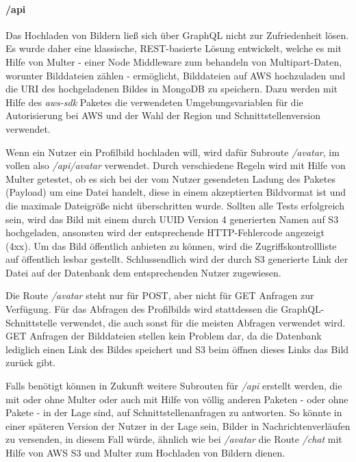 \paragraph{/api\\}
Das Hochladen von Bildern ließ sich über GraphQL nicht zur Zufriedenheit lösen. Es wurde daher eine klassische, REST-basierte Lösung entwickelt, welche es mit Hilfe von Multer - einer Node Middleware zum behandeln von Multipart-Daten, worunter Bilddateien zählen - ermöglicht, Bilddateien auf AWS hochzuladen und die URI des hochgeladenen Bildes in MongoDB zu speichern. Dazu werden mit Hilfe des \textit{aws-sdk} Paketes die verwendeten Umgebungsvariablen für die Autorisierung bei AWS und der Wahl der Region und Schnittstellenversion verwendet. 

Wenn ein Nutzer ein Profilbild hochladen will, wird dafür Subroute \textit{/avatar}, im vollen also \textit{/api/avatar} verwendet. Durch verschiedene Regeln wird mit Hilfe von Multer getestet, ob es sich bei der vom Nutzer gesendeten Ladung des Paketes (Payload) um eine Datei handelt, diese in einem akzeptierten Bildvormat ist und die maximale Dateigröße nicht überschritten wurde. Sollten alle Tests erfolgreich sein, wird das Bild mit einem durch UUID Version 4 generierten Namen auf S3 hochgeladen, ansonsten wird der entsprechende HTTP-Fehlercode angezeigt (4xx). Um das Bild öffentlich anbieten zu können, wird die Zugriffskontrollliste auf öffentlich lesbar gestellt. Schlussendlich wird der durch S3 generierte Link der Datei auf der Datenbank dem entsprechenden Nutzer zugewiesen.

Die Route \textit{/avatar} steht nur für POST, aber nicht für GET Anfragen zur Verfügung. Für das Abfragen des Profilbilds wird stattdessen die GraphQL-Schnittstelle verwendet, die auch sonst für die meisten Abfragen verwendet wird. GET Anfragen der Bilddateien stellen kein Problem dar, da die Datenbank lediglich einen Link des Bildes speichert und S3 beim öffnen dieses Links das Bild zurück gibt.

Falls benötigt können in Zukunft weitere Subrouten für \textit{/api} erstellt werden, die mit oder ohne Multer oder auch mit Hilfe von völlig anderen Paketen - oder ohne Pakete - in der Lage sind, auf Schnittstellenanfragen zu antworten. So könnte in einer späteren Version der Nutzer in der Lage sein, Bilder in Nachrichtenverläufen zu versenden, in diesem Fall würde, ähnlich wie bei \textit{/avatar} die Route \textit{/chat} mit Hilfe von AWS S3 und Multer zum Hochladen von Bildern dienen.

